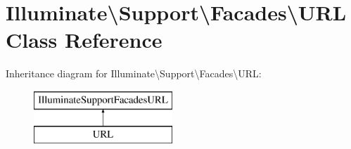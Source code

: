 \hypertarget{class_illuminate_1_1_support_1_1_facades_1_1_u_r_l}{}\section{Illuminate\textbackslash{}Support\textbackslash{}Facades\textbackslash{}U\+RL Class Reference}
\label{class_illuminate_1_1_support_1_1_facades_1_1_u_r_l}
Inheritance diagram for Illuminate\textbackslash{}Support\textbackslash{}Facades\textbackslash{}U\+RL\+:\begin{figure}[H]
\begin{center}
\leavevmode
\includegraphics[height=2.000000cm]{class_illuminate_1_1_support_1_1_facades_1_1_u_r_l}
\end{center}
\end{figure}
